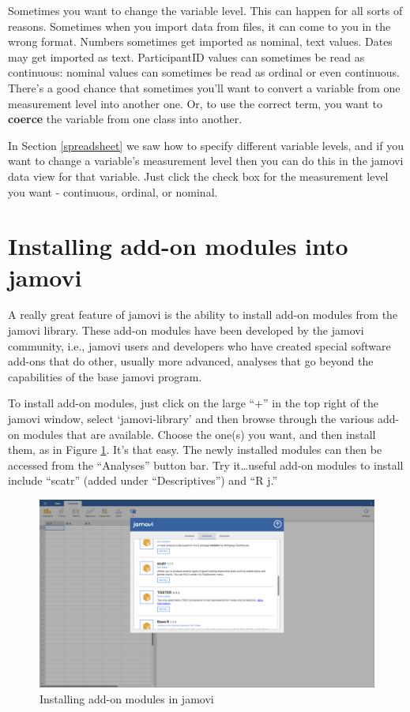 \documentclass[
]{book}
\begin{document}
Sometimes you want to change the variable level. This can happen for all sorts of reasons. Sometimes when you import data from files, it can come to you in the wrong format. Numbers sometimes get imported as nominal, text values. Dates may get imported as text. ParticipantID values can sometimes be read as continuous: nominal values can sometimes be read as ordinal or even continuous. There's a good chance that sometimes you'll want to convert a variable from one measurement level into another one. Or, to use the correct term, you want to {\textbf{coerce}} the variable from one class into another.

In Section \ref{spreadsheet} we saw how to specify different variable levels, and if you want to change a variable's measurement level then you can do this in the jamovi data view for that variable. Just click the check box for the measurement level you want - continuous, ordinal, or nominal.

\hypertarget{jamovimodules}{%
\section{Installing add-on modules into jamovi}\label{jamovimodules}}

A really great feature of jamovi is the ability to install add-on modules from the jamovi library. These add-on modules have been developed by the jamovi community, i.e., jamovi users and developers who have created special software add-ons that do other, usually more advanced, analyses that go beyond the capabilities of the base jamovi program.

To install add-on modules, just click on the large ``+'' in the top right of the jamovi window, select `jamovi-library' and then browse through the various add-on modules that are available. Choose the one(s) you want, and then install them, as in Figure \ref{fig:modules}. It's that easy. The newly installed modules can then be accessed from the ``Analyses'' button bar. Try it\ldots useful add-on modules to install include ``scatr'' (added under ``Descriptives'') and ``R j.''

\begin{figure}
\includegraphics[width=26.67in]{img/graphics/modules} \caption{Installing add-on modules in jamovi}\label{fig:modules}
\end{figure}
\end{document}
